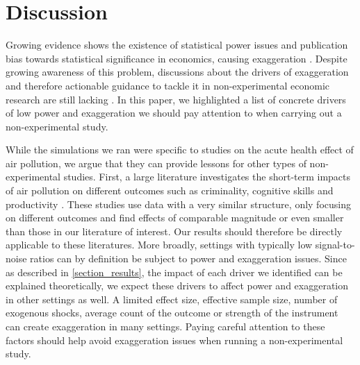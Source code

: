 \documentclass[12pt]{article}
\begin{document}



\section{Discussion}\label{section_discussion}

        \begin{sloppypar}
        Growing evidence shows the existence of statistical power issues and publication bias towards statistical significance in economics, causing exaggeration \citep{brodeur_star_2016, ioannidis_power_2017, brodeur_methods_2020, ferraro_feature_2020}. Despite growing awareness of this problem, discussions about the drivers of exaggeration and therefore actionable guidance to tackle it in non-experimental economic research are still lacking \citep{altoe_enhancing_2020, black_simulated_2022}. In this paper, we highlighted a list of concrete drivers of low power and exaggeration we should pay attention to when carrying out a non-experimental study. %
        \end{sloppypar}

        While the simulations we ran were specific to studies on the acute health effect of air pollution, we argue that they can provide lessons for other types of non-experimental studies. First, a large literature investigates the short-term impacts of air pollution on different outcomes such as criminality, cognitive skills and productivity \citep[for instance]{herrnstadt_air_2021, ebenstein_long-run_2016, adhvaryu2022management}. These studies use data with a very similar structure, only focusing on different outcomes and find effects of comparable magnitude or even smaller than those in our literature of interest. Our results should therefore be directly applicable to these literatures. More broadly, settings with typically low signal-to-noise ratios can by definition be subject to power and exaggeration issues. Since as described in \cref{section_results}, the impact of each driver we identified can be explained theoretically, we expect these drivers to affect power and exaggeration in other settings as well. A limited effect size, effective sample size, number of exogenous shocks, average count of the outcome or strength of the instrument can create exaggeration in many settings. Paying careful attention to these factors should help avoid exaggeration issues when running a non-experimental study.
        
\end{document}
